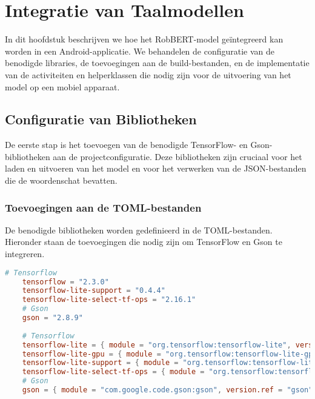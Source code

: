 
\chapter{Integratie van Taalmodellen}
\label{ch:integratie-taalmodellen}

In dit hoofdstuk beschrijven we hoe het RobBERT-model geïntegreerd kan worden in een Android-applicatie. We behandelen de configuratie van de benodigde libraries, de toevoegingen aan de build-bestanden, en de implementatie van de activiteiten en helperklassen die nodig zijn voor de uitvoering van het model op een mobiel apparaat.

\section{Configuratie van Bibliotheken}

De eerste stap is het toevoegen van de benodigde TensorFlow- en Gson-bibliotheken aan de projectconfiguratie. Deze bibliotheken zijn cruciaal voor het laden en uitvoeren van het model en voor het verwerken van de JSON-bestanden die de woordenschat bevatten.

\subsection{Toevoegingen aan de TOML-bestanden}

De benodigde bibliotheken worden gedefinieerd in de TOML-bestanden. Hieronder staan de toevoegingen die nodig zijn om TensorFlow en Gson te integreren.

\begin{lstlisting}[language=Toml, caption={Toevoegingen aan de TOML-bestanden}]
    # Tensorflow
    tensorflow = "2.3.0"
    tensorflow-lite-support = "0.4.4"
    tensorflow-lite-select-tf-ops = "2.16.1"
    # Gson
    gson = "2.8.9"
    
    # Tensorflow
    tensorflow-lite = { module = "org.tensorflow:tensorflow-lite", version.ref = "tensorflow" }
    tensorflow-lite-gpu = { module = "org.tensorflow:tensorflow-lite-gpu", version.ref = "tensorflow" }
    tensorflow-lite-support = { module = "org.tensorflow:tensorflow-lite-support", version.ref = "tensorflow-lite-support" }
    tensorflow-lite-select-tf-ops = { module = "org.tensorflow:tensorflow-lite-select-tf-ops", version.ref = "tensorflow-lite-select-tf-ops" }
    # Gson
    gson = { module = "com.google.code.gson:gson", version.ref = "gson" }
\end{lstlisting}

